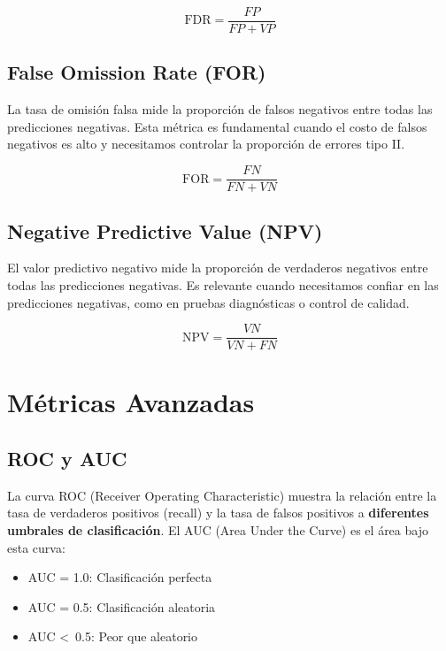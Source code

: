 \documentclass[12pt]{article}
\begin{document}
\vspace{0.3em}

\[
\text{FDR} = \frac{FP}{FP + VP}
\]

\vspace{0.3em}

\subsection{False Omission Rate (FOR)}
La tasa de omisión falsa mide la proporción de falsos negativos entre todas las predicciones negativas. Esta métrica es fundamental cuando el costo de falsos negativos es alto y necesitamos controlar la proporción de errores tipo II.

\vspace{0.3em}

\[
\text{FOR} = \frac{FN}{FN + VN}
\]

\vspace{0.3em}

\subsection{Negative Predictive Value (NPV)}
El valor predictivo negativo mide la proporción de verdaderos negativos entre todas las predicciones negativas. Es relevante cuando necesitamos confiar en las predicciones negativas, como en pruebas diagnósticas o control de calidad.

\vspace{0.3em}

\[
\text{NPV} = \frac{VN}{VN + FN}
\]

\vspace{0.3em}

\section{Métricas Avanzadas}
\subsection{ROC y AUC}
La curva ROC (Receiver Operating Characteristic) muestra la relación entre la tasa de verdaderos positivos (recall) y la tasa de falsos positivos a \textbf{diferentes umbrales de clasificación}. El AUC (Area Under the Curve) es el área bajo esta curva:
\begin{itemize}
    \item AUC = 1.0: Clasificación perfecta
    \item AUC = 0.5: Clasificación aleatoria
    \item AUC <\ 0.5: Peor que aleatorio
\end{itemize}
\end{document}
